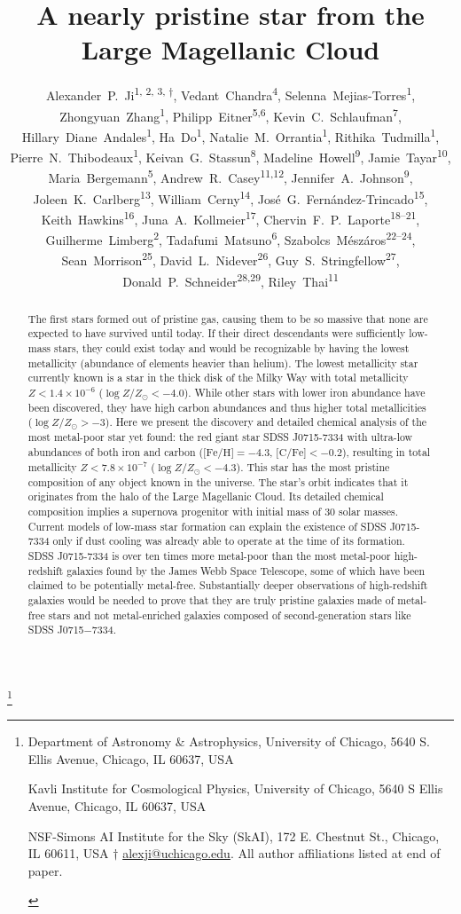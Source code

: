 \documentclass{natureprintstyle}
\title{A nearly pristine star from the Large Magellanic Cloud}
\author{Alexander~P.~Ji\textsuperscript{1, 2, 3, $\dagger$}, %
Vedant~Chandra\textsuperscript{4},                           %
Selenna~Mejias-Torres\textsuperscript{1},                    %
Zhongyuan~Zhang\textsuperscript{1},                          %
Philipp~Eitner\textsuperscript{5,6},                         %
Kevin~C.~Schlaufman\textsuperscript{7},                      %
Hillary~Diane~Andales\textsuperscript{1},                    %
Ha~Do\textsuperscript{1},                                    %
Natalie~M.~Orrantia\textsuperscript{1},                      %
Rithika~Tudmilla\textsuperscript{1},                         %
Pierre~N.~Thibodeaux\textsuperscript{1},                     %
Keivan~G.~Stassun\textsuperscript{8},                        %
Madeline~Howell\textsuperscript{9},                          %
Jamie~Tayar\textsuperscript{10},                             %
Maria~Bergemann\textsuperscript{5},                          %
Andrew~R.~Casey\textsuperscript{11,12},                      %
Jennifer~A.~Johnson\textsuperscript{9},                      %
Joleen~K.~Carlberg\textsuperscript{13},                      %
William~Cerny\textsuperscript{14},                           %
Jos\'e~G.~Fern\'andez-Trincado\textsuperscript{15},          %
Keith~Hawkins\textsuperscript{16},                           %
Juna~A.~Kollmeier\textsuperscript{17},                       %
Chervin~F.~P.~Laporte\textsuperscript{18--21},               %
Guilherme~Limberg\textsuperscript{2},                        %
Tadafumi~Matsuno\textsuperscript{6},                         %
Szabolcs~M{\'e}sz{\'a}ros\textsuperscript{22--24},           %
Sean~Morrison\textsuperscript{25},                           %
David~L.~Nidever\textsuperscript{26},                        %
Guy~S.~Stringfellow\textsuperscript{27},                     %
Donald~P.~Schneider\textsuperscript{28,29},                  %
Riley~Thai\textsuperscript{11}                               %
}
\newcommand{\logzzsun}{\ensuremath{\log Z/Z_\odot}\xspace}
\begin{document}
\maketitle
\let\thefootnote\relax\footnote{

\begin{affiliations}
\item Department of Astronomy \& Astrophysics, University of Chicago, 5640 S. Ellis Avenue, Chicago, IL 60637, USA
\item Kavli Institute for Cosmological Physics, University of Chicago, 5640 S Ellis Avenue, Chicago, IL 60637, USA
\item NSF-Simons AI Institute for the Sky (SkAI), 172 E. Chestnut St., Chicago, IL 60611, USA
$\dagger$ \href{mailto:alexji@uchicago.edu}{alexji@uchicago.edu}.
All author affiliations listed at end of paper.
\end{affiliations}
}


\vspace{-3.5mm}
\begin{abstract}
The first stars formed out of pristine gas, causing them to be so massive that none are expected to have survived until today\cite{Bromm2009,Klessen2023}.  If their direct descendants were sufficiently low-mass stars, they could exist today and would be recognizable by having the lowest metallicity (abundance of elements heavier than helium)\cite{Frebel2015}. The lowest metallicity star currently known is a star in the thick disk of the Milky Way with total metallicity $Z < 1.4 \times 10^{-6}$ ($\logzzsun < -4.0$)\cite{Caffau2011,Lagae2023,Caffau2024}. While other stars with lower iron abundance have been discovered\cite{Christlieb2002,Frebel2005,Keller2014}, they have high carbon abundances and thus higher total metallicities ($\logzzsun > -3$). Here we present the discovery and detailed chemical analysis of the most metal-poor star yet found: the red giant star SDSS J0715-7334 with ultra-low abundances of both iron and carbon ($\mbox{[Fe/H]} = -4.3$, $\mbox{[C/Fe]} < -0.2$), resulting in total metallicity $Z < 7.8 \times 10^{-7}$ ($\logzzsun < -4.3$). This star has the most pristine composition of any object known in the universe. The star's orbit indicates that it originates from the halo of the Large Magellanic Cloud. Its detailed chemical composition implies a supernova progenitor with initial mass of 30 solar masses\cite{Heger2010}. Current models of low-mass star formation can explain the existence of SDSS J0715-7334 only if dust cooling was already able to operate at the time of its formation\cite{Schneider2003,Schneider2012}. SDSS J0715-7334 is over ten times more metal-poor than the most metal-poor high-redshift galaxies found by the James Webb Space Telescope, some of which have been claimed to be potentially metal-free\cite{Fujimoto2025,Nakajima2025,Morishita2025}. Substantially deeper observations of high-redshift galaxies would be needed to prove that they are truly pristine galaxies made of metal-free stars and not metal-enriched galaxies composed of second-generation stars like SDSS J0715$-$7334\cite{Katz2023}.
\end{abstract}
\end{document}
